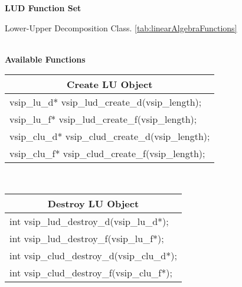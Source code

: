 \clearpage
{\large \textbf{\hypertarget{firFunc}{LUD Function Set}}}\vspace{.2cm}\\
\hspace*{.3cm}
\parbox{0.85\textwidth}{Lower-Upper Decomposition Class. \ref{tab:linearAlgebraFunctions}}
\\\cvsiplh 
\newline \hspace*{.8cm} \vspace*{.1cm} \textbf{Available Functions }
%
\newline \hspace*{1.cm} {
\ttfamily\vspace{.3cm}
\begin{tabular}[H]{|l|}
\multicolumn{1}{c}{\rmfamily \bfseries Create LU Object\vspace{.1cm}}\\ \hline
vsip\_lu\_d* vsip\_lud\_create\_d(vsip\_length);\\
vsip\_lu\_f* vsip\_lud\_create\_f(vsip\_length);\\
vsip\_clu\_d* vsip\_clud\_create\_d(vsip\_length);\\
vsip\_clu\_f* vsip\_clud\_create\_f(vsip\_length);\\
\hline\end{tabular}\\}
%
\newline \hspace*{1.cm} {
\ttfamily\vspace{.3cm}
\begin{tabular}[H]{|l|}
\multicolumn{1}{c}{\rmfamily \bfseries Destroy LU Object\vspace{.1cm}}\\ \hline
int vsip\_lud\_destroy\_d(vsip\_lu\_d*);\\
int vsip\_lud\_destroy\_f(vsip\_lu\_f*);\\
int vsip\_clud\_destroy\_d(vsip\_clu\_d*);\\
int vsip\_clud\_destroy\_f(vsip\_clu\_f*);\\
\hline\end{tabular}\\}
